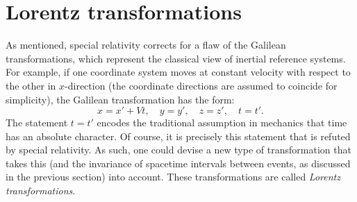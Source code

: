 \section{Lorentz transformations}
\label{sec:lorentz_transformations}
As mentioned, special relativity corrects for a flaw of the Galilean transformations, which represent the classical view of inertial reference systems. For example, if one coordinate system moves at constant velocity  with respect to the other in \(x\)-direction (the coordinate directions are assumed to coincide for simplicity), the Galilean transformation has the form:
\begin{equation}
    x = x' + Vt, \quad y = y', \quad z = z',\quad t = t'.
    \label{eq:galilean_transform}
\end{equation}
The statement \(t = t'\) encodes the traditional assumption in mechanics that time has an absolute character. Of course, it is precisely this statement that is refuted by special relativity. As such, one could devise a new type of transformation that takes this (and the invariance of spacetime intervals between events, as discussed in the previous section) into account. These transformations are called \emph{Lorentz transformations}. 

